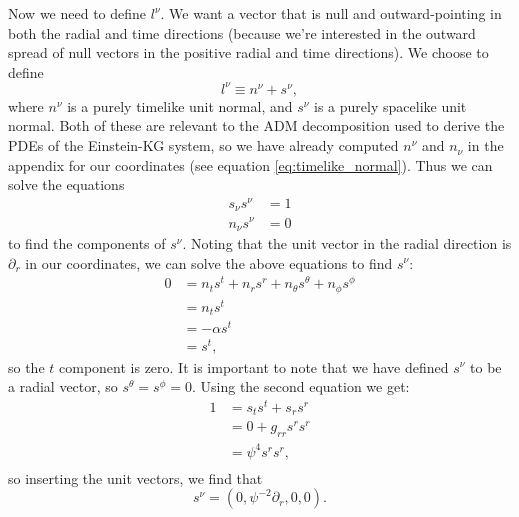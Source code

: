 \documentclass[12pt]{article}
\numberwithin{equation}{section}
\begin{document}
Now we need to define $l^\nu$.  We want a vector that is null and outward-pointing in both the radial and time directions (because we're interested in the outward spread of null vectors in the positive radial and time directions).  We choose to define
\begin{equation}
l^\nu \equiv n^\nu + s^\nu,
\end{equation}
where $n^\nu$ is a purely timelike unit normal, and $s^\nu$ is a purely spacelike unit normal.  Both of these are relevant to the ADM decomposition used to derive the PDEs of the Einstein-KG system, so we have already computed $n^\nu$ and $n_\nu$ in the appendix for our coordinates (see equation \ref{eq:timelike_normal}).  Thus we can solve the equations
\begin{equation}
\begin{aligned}
s_\nu s^\nu &= 1 \\
n_\nu s^\nu &= 0
\end{aligned}
\end{equation}
to find the components of $s^\nu$.  Noting that the unit vector in the radial direction is $\partial_r$ in our coordinates, we can solve the above equations to find $s^\nu$:
\begin{equation}
\begin{aligned}
0 &= n_t s^t + n_r s^r + n_\theta s^\theta + n_\phi s^\phi \\
&= n_t s^t \\
&= -\alpha s^t \\
&= s^t,
\end{aligned}
\end{equation}
so the $t$ component is zero.  It is important to note that we have defined $s^\nu$ to be a radial vector, so $s^\theta = s^\phi = 0$.  Using the second equation we get:
\begin{equation}
\begin{aligned}
1 &= s_t s^t + s_r s^r \\
&= 0 + g_{rr} s^r s^r \\
&= \psi^4 s^r s^r, \\
\end{aligned}
\end{equation}
so inserting the unit vectors, we find that
\begin{equation}
s^\nu = (0, \psi^{-2} \partial_r, 0, 0).
\end{equation}
\end{document}
